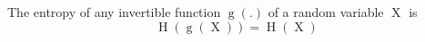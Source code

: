 The entropy of any invertible function $\operatorname{g}(.)$ of a random variable $\operatorname{X}$ is
$$\operatorname{H}(\operatorname{g}(\operatorname{X})) = \operatorname{H}(\operatorname{X})$$

